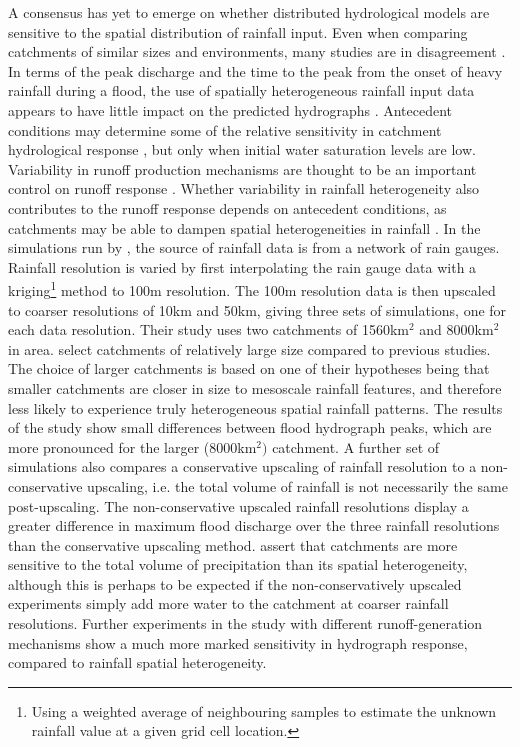A consensus has yet to emerge on whether distributed hydrological models are sensitive to the spatial distribution of rainfall input. Even when comparing catchments of similar sizes and environments, many studies are in disagreement \citep{nicotina2008impact}. In terms of the peak discharge and the time to the peak from the onset of heavy rainfall during a flood, the use of spatially heterogeneous rainfall input data appears to have little impact on the predicted hydrographs \citep{krajewski1991monte,shah1996amodelling,shah1996bmodelling}. Antecedent conditions may determine some of the relative sensitivity in catchment hydrological response \citep{shah1996bmodelling}, but only when initial water saturation levels are low. Variability in runoff production mechanisms are thought to be an important control on runoff response \citep{shah1996bmodelling,segond2007simulation}. Whether variability in rainfall heterogeneity also contributes to the runoff response depends on antecedent conditions, as catchments may be able to dampen spatial heterogeneities in rainfall \citep{segond2007simulation}. In the simulations run by \citet{nicotina2008impact}, the source of rainfall data is from a network of rain gauges. Rainfall resolution is varied by first interpolating the rain gauge data with a kriging\footnote{Using a weighted average of neighbouring samples to estimate the unknown rainfall value at a given grid cell location.} method to 100m resolution. The 100m resolution data is then upscaled to coarser resolutions of 10km and 50km, giving three sets of simulations, one for each data resolution. Their study uses two catchments of 1560km\(^2\) and 8000km\(^2\) in area. \citet{nicotina2008impact} select catchments of relatively large size compared to previous studies. The choice of larger catchments is based on one of their hypotheses being that smaller catchments are closer in size to mesoscale rainfall features, and therefore less likely to experience truly heterogeneous spatial rainfall patterns. The results of the \citet{nicotina2008impact} study show small differences between flood hydrograph peaks, which are more pronounced for the larger (8000km\(^2)\) catchment. A further set of simulations also compares a conservative upscaling of rainfall resolution to a non-conservative upscaling, i.e. the total volume of rainfall is not necessarily the same post-upscaling. The non-conservative upscaled rainfall resolutions display a greater difference in maximum flood discharge over the three rainfall resolutions than the conservative upscaling method. \citet{nicotina2008impact} assert that catchments are more sensitive to the total volume of precipitation than its spatial heterogeneity, although this is perhaps to be expected if the non-conservatively upscaled experiments simply add more water to the catchment at coarser rainfall resolutions.  Further experiments in the \citet{nicotina2008impact} study with different runoff-generation mechanisms show a much more marked sensitivity in hydrograph response, compared to rainfall spatial heterogeneity. 

